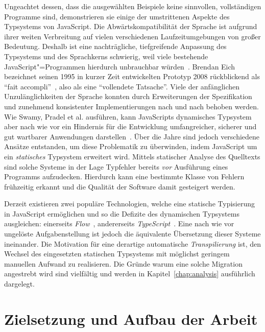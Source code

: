 Ungeachtet dessen, dass die ausgewählten Beispiele keine sinnvollen, vollständigen Programme sind, demonstrieren sie einige der umstrittenen Aspekte des Typsystems von JavaScript. Die Abwärtskompatibilität der Sprache ist aufgrund ihrer weiten Verbreitung auf vielen verschiedenen Laufzeitumgebungen von großer Bedeutung. Deshalb ist eine nachträgliche, tiefgreifende Anpassung des Typsystems und des Sprachkerns schwierig, weil viele bestehende JavaScript"=Programmen hierdurch unbrauchbar würden~\autocite[1]{CROCKFORD:JS_GOOD_PARTS}. Brendan Eich bezeichnet seinen 1995 in kurzer Zeit entwickelten Prototyp 2008 rückblickend als \enquote{fait accompli}~\autocite{EICH:POPULARITY}, also als eine \enquote{vollendete Tatsache}.
Viele der anfänglichen Unzulänglichkeiten der Sprache konnten durch Erweiterungen der Spezifikation und zunehmend konsistenter Implementierungen nach und nach behoben werden. Wie Swamy, Pradel et al. ausführen, kann JavaScripts dynamisches Typsystem aber nach wie vor ein Hindernis für die Entwicklung umfangreicher, sicherer und gut wartbarer Anwendungen darstellen~\autocite{NIKHIL:2014,PRADEL:2015}. Über die Jahre sind jedoch verschiedene Ansätze entstanden, um diese Problematik zu überwinden, indem JavaScript um ein \emph{statisches} Typsystem erweitert wird. Mittels statischer Analyse des Quelltexts sind solche Systeme in der Lage Typfehler bereits \emph{vor} Ausführung eines Programms aufzudecken. Hierdurch kann eine bestimmte Klasse von Fehlern frühzeitig erkannt und die Qualität der Software damit gesteigert werden.

Derzeit existieren zwei populäre Technologien, welche eine statische Typisierung in JavaScript ermöglichen und so die Defizite des dynamischen Typsystems ausgleichen: einerseits \textit{Flow}~\autocite{FLOW:PAPER}, andererseits \textit{TypeScript}~\autocite{TYPESCRIPT:SPEC}. Eine nach wie vor ungelöste Aufgabenstellung ist jedoch die äquivalente Übersetzung dieser Systeme ineinander. Die Motivation für eine derartige automatische \emph{Transpilierung} ist, den Wechsel des eingesetzten statischen Typsystems mit möglichst geringem manuellen Aufwand zu realisieren. Die Gründe warum eine solche Migration angestrebt wird sind vielfältig und werden in Kapitel~\ref{chap:analysis} ausführlich dargelegt.

\section{Zielsetzung und Aufbau der Arbeit}

